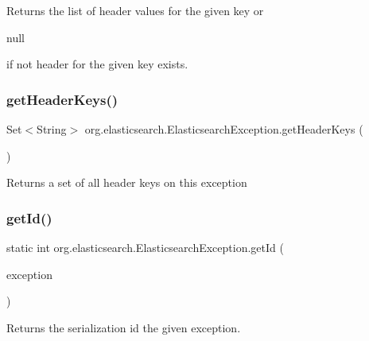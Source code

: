 Returns the list of header values for the given key or
\begin{DoxyCode}
null 
\end{DoxyCode}
 if not header for the given key exists. \hypertarget{classorg_1_1elasticsearch_1_1_elasticsearch_exception_ac6b0fc84271df098d018e69db92058a4}{}\label{classorg_1_1elasticsearch_1_1_elasticsearch_exception_ac6b0fc84271df098d018e69db92058a4} 
\subsubsection{\texorpdfstring{get\+Header\+Keys()}{getHeaderKeys()}}
{\footnotesize\ttfamily Set$<$String$>$ org.\+elasticsearch.\+Elasticsearch\+Exception.\+get\+Header\+Keys (\begin{DoxyParamCaption}{ }\end{DoxyParamCaption})}

Returns a set of all header keys on this exception \hypertarget{classorg_1_1elasticsearch_1_1_elasticsearch_exception_aba2a26f7f9671d79bdd82f9c7de2bab7}{}\label{classorg_1_1elasticsearch_1_1_elasticsearch_exception_aba2a26f7f9671d79bdd82f9c7de2bab7} 
\subsubsection{\texorpdfstring{get\+Id()}{getId()}}
{\footnotesize\ttfamily static int org.\+elasticsearch.\+Elasticsearch\+Exception.\+get\+Id (\begin{DoxyParamCaption}\item[{Class$<$? extends \hyperlink{classorg_1_1elasticsearch_1_1_elasticsearch_exception}{Elasticsearch\+Exception} $>$}]{exception }\end{DoxyParamCaption})\hspace{0.3cm}{\ttfamily [static]}}

Returns the serialization id the given exception. \hypertarget{classorg_1_1elasticsearch_1_1_elasticsearch_exception_a1d174a2312e18c883196ec07c87c2f50}{}\label{classorg_1_1elasticsearch_1_1_elasticsearch_exception_a1d174a2312e18c883196ec07c87c2f50} 

